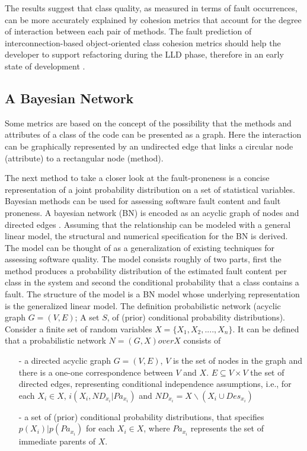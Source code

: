 The results suggest that class quality, as measured in terms of fault occurrences, can be more accurately explained by cohesion metrics that account for the degree of interaction between each pair of methods. The fault prediction of interconnection-based object-oriented class cohesion metrics should help the developer to support refactoring during the LLD phase, therefore in an early state of development \cite{b8al2012precise}.


\subsection{A Bayesian Network}

Some metrics are based on the concept of the possibility that the methods and attributes of a class of the code can be presented as a graph. Here the interaction can be graphically represented by an undirected edge that links a circular node (attribute) to a rectangular node (method).

The next method to take a closer look at the fault-proneness is a concise representation of a joint probability distribution on a set of statistical variables. Bayesian methods can be used for assessing software fault content and fault proneness. A bayesian network (BN) is encoded as an acyclic graph of nodes and directed edges \cite{b9pai2007empirical}. Assuming that the relationship can be modeled with a general linear model, the structural and numerical specification for the BN is derived. The model can be thought of as a generalization of existing techniques for assessing software quality. The model consists roughly of two parts, first the method produces a probability distribution of the estimated fault content per class in the system and second the conditional probability that a class contains a fault. 
The structure of the model is a BN model whose underlying representation is the generalized linear model. The definition probabilistic network (acyclic graph $G=(V,E)$; A set $S$, of (prior) conditional probability distributions).
Consider a finite set of random variables $X=\{X_1,X_2,....,X_n\}$. It can be defined that a probabilistic network $N=(G,X) over X$ consists of
 \begin{enumerate}
 	\item[-] a directed acyclic graph $G=(V,E)$, $V$ is the set of nodes in the graph and there is a one-one correspondence between $V$ and $X$. $E \subseteq V \times V$ the set of directed edges, representing conditional independence assumptions, i.e., for each $X_i \in X$, $i(X_i,N D_{x_i}| Pa_{x_i})$ and $N D_{x_i} = X \backslash ({X_i} \cup Des_{x_i})$ 
 	\item[-] a set of (prior) conditional probability distributions, that specifies $p(X_i)| p(Pa_{x_i})$ for each $X_i \in X$, where $Pa_{x_i}$ represents the set of immediate parents of $X$.
 \end{enumerate} 

